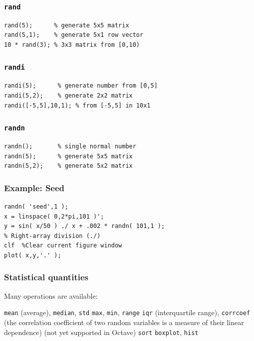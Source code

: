 \documentclass[11pt]{beamer}
\begin{document}
\begin{frame}[fragile]
  \frametitle{\texttt{rand}}
  \Enlarge

  \begin{Verbatim}
rand(5);      % generate 5x5 matrix
rand(5,1);    % generate 5x1 row vector
10 * rand(3); % 3x3 matrix from [0,10)
  \end{Verbatim}
\end{frame}

\begin{frame}[fragile]
  \frametitle{\texttt{randi}}
  \Enlarge

  \begin{Verbatim}
randi(5);      % generate number from [0,5]
randi(5,2);    % generate 2x2 matrix
randi([-5,5],10,1); % from [-5,5] in 10x1
  \end{Verbatim}
\end{frame}

\begin{frame}[fragile]
  \frametitle{\texttt{randn}}
  \Enlarge

  \begin{Verbatim}
randn();       % single normal number
randn(5);      % generate 5x5 matrix
randn(5,2);    % generate 5x2 matrix
  \end{Verbatim}
\end{frame}

\begin{frame}[fragile]
  \frametitle{Example:  Seed}

  \begin{Verbatim}
randn( 'seed',1 );
x = linspace( 0,2*pi,101 )';
y = sin( x/50 ) ./ x + .002 * randn( 101,1 );
% Right-array division (./)
clf  %Clear current figure window
plot( x,y,'.' );
  \end{Verbatim}
\end{frame}

\begin{frame}[fragile]
  \frametitle{Statistical quantities}
  \Enlarge

  \begin{enumerate}
  \myitem  Many operations are available:
    \begin{enumerate}
    \mysubitem  \texttt{mean} (average), \texttt{median}, \texttt{std}
    \mysubitem  \texttt{max}, \texttt{min}, \texttt{range}
    \mysubitem  \texttt{iqr} (interquartile range), \texttt{corrcoef} (the correlation coefficient of two random variables is a measure of their linear dependence) (not yet supported in Octave)
    \mysubitem  \texttt{sort}
    \mysubitem  \texttt{boxplot}, \texttt{hist}
    \end{enumerate}
  \end{enumerate}
\end{frame}
\end{document}
